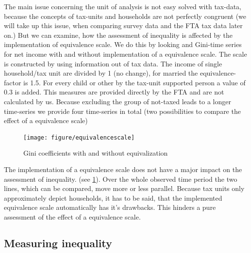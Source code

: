 \documentclass[twoside]{article}\usepackage[]{graphicx}\usepackage[]{color}
\newenvironment{knitrout}{}{} %
\begin{document}
\begin{multicols}{2}
The main issue concerning the unit of analysis is not easy solved with tax-data, because the concepts of tax-units and households are not perfectly congruent (we will take up this issue, when comparing survey data and the FTA tax data later on.) But we can examine, how the assessment of inequality is affected by the implementation of equivalence scale. We do this by looking and Gini-time series for net income with and without implementation of a equivalence scale. The scale is constructed by using information out of tax data. The income of single household/tax unit are divided by 1 (no change), for married the equivalence-factor is 1.5. For every child or other by the tax-unit supported person a value of 0.3 is added. This measures are provided directly by the FTA and are not calculated by us. Because excluding the group of not-taxed leads to a longer time-series we provide four time-series in total (two possibilities to compare the effect of a equivalence scale)





\begin{knitrout}
\color{fgcolor}\begin{figure}[H]

\texttt{[image: figure/equivalencescale]} \caption[Gini coefficients with and without equivalization]{Gini coefficients with and without equivalization\label{fig:equivalencescale}}
\end{figure}


\end{knitrout}


The implementation of a equivalence scale does not have a major impact on the assessment of inequality. (see \ref{fig:equivalencescale}). Over the whole observed time period the two lines, which can be compared, move more or less parallel. Because tax units only approximately depict households, it has to be said, that the implemented equivalence scale automatically has it's drawbacks. This hinders a pure assessment of the effect of a equivalence scale.



\subsection{Measuring inequality}


\end{multicols}
\end{document}

